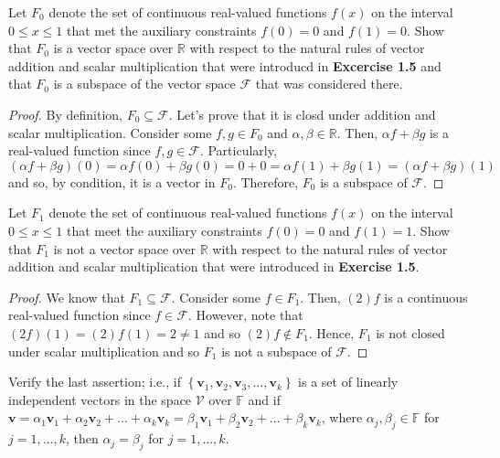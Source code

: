 \documentclass[12pt]{article}
\newcommand{\R}{\mathbb{R}}
\newenvironment{problem}[2][Problem]{\begin{trivlist} \item[\hskip \labelsep {\bfseries #1}\hskip \labelsep {\bfseries #2.}]}{\end{trivlist}}
\begin{document}
    \begin{problem}{1.6}
      Let $F_{0}$ denote the set of continuous real-valued functions $f(x)$ on the interval $0\leq x \leq 1$ that met the auxiliary constraints $f(0) =0$ and $f(1) = 0$. Show that $F_{0}$ is a vector space over $\R$ with respect to the natural rules of vector addition and scalar multiplication that were introducd in \textbf{Excercise 1.5} and that $F_{0}$ is a subspace of the vector space $\mathcal{F}$ that was considered there.
    \end{problem}
    \begin{proof}
      By definition, $F_{0} \subseteq \mathcal{F}$. Let's prove that it is closd under addition and scalar multiplication. Consider some $f, g\in F_{0}$ and $\alpha,\beta\in \R$. Then, $\alpha f + \beta g$ is a real-valued function since $f,g\in \mathcal{F}$. Particularly, $(\alpha f + \beta g)(0) = \alpha f(0) + \beta g(0) = 0 + 0 = \alpha f(1) + \beta g(1) = (\alpha f+ \beta g)(1)$ and so, by condition, it is a vector in $F_{0}$. Therefore, $F_{0}$ is a subspace of $\mathcal{F}$. 
    \end{proof}
    \begin{problem}{1.7}
      Let $F_{1}$ denote the set of continuous real-valued functions $f(x)$ on the interval $0\leq x \leq 1$ that meet the auxiliary constraints $f(0)=0$ and $f(1)=1$. Show that $F_{1}$ is not a vector space over $\R$ with respect to the natural rules of vector addition and scalar multiplication that were introduced in \textbf{Exercise 1.5}.
    \end{problem}
    \begin{proof}
      We know that $F_{1}\subseteq \mathcal{F}$. Consider some $f\in F_{1}$. Then, $(2)f$ is a continuous real-valued function since $f\in \mathcal{F}$. However, note that $(2f)(1) = (2)f(1) = 2 \neq 1$ and so $(2)f\not\in F_{1}$. Hence, $F_{1}$ is not closed under scalar multiplication and so $F_{1}$ is not a subspace of $\mathcal{F}$. 
    \end{proof}
    \begin{problem}{1.8}
      Verify the last assertion; i.e., if $\left\{ \mathbf{v}_{1}, \mathbf{v}_{2}, \mathbf{v}_{3}, \dots, \mathbf{v}_{k} \right\}$ is a set of linearly independent vectors in the space $\mathcal{V}$ over $\mathbb{F}$ and if $\mathbf{v} = \alpha_{1}\mathbf{v}_{1} + \alpha_{2}\mathbf{v}_{2} + \dots+\alpha_{k}\mathbf{v}_{k} = \beta_{1}\mathbf{v}_{1} + \beta_{2}\mathbf{v}_{2}+ \dots+ \beta_{k}\mathbf{v}_{k}$, where $\alpha_{j},\beta_{j}\in \mathbb{F}$ for $j=1,\dots,k$, then $\alpha_{j} = \beta_{j}$ for $j=1,\dots,k$.
    \end{problem}
\end{document}
